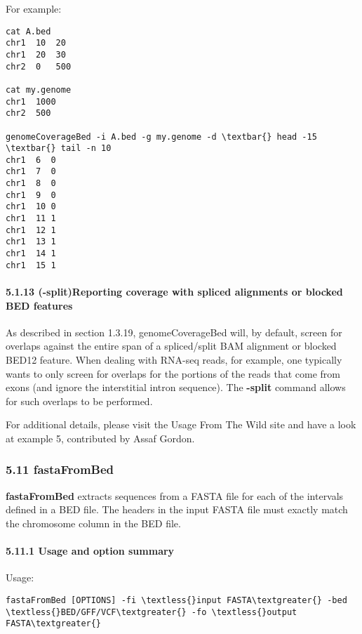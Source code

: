 \documentclass[letterpaper,10pt,english]{sphinxmanual}
\begin{document}
For example:

\begin{Verbatim}[commandchars=\\\{\}]
cat A.bed
chr1  10  20
chr1  20  30
chr2  0   500

cat my.genome
chr1  1000
chr2  500

genomeCoverageBed -i A.bed -g my.genome -d \textbar{} head -15 \textbar{} tail -n 10
chr1  6  0
chr1  7  0
chr1  8  0
chr1  9  0
chr1  10 0
chr1  11 1
chr1  12 1
chr1  13 1
chr1  14 1
chr1  15 1
\end{Verbatim}


\paragraph{5.1.13 (-split)Reporting coverage with spliced alignments or blocked BED features}
\label{content/genomecoverageBed:split-reporting-coverage-with-spliced-alignments-or-blocked-bed-features}
As described in section 1.3.19, genomeCoverageBed will, by default, screen for overlaps against the
entire span of a spliced/split BAM alignment or blocked BED12 feature. When dealing with RNA-seq
reads, for example, one typically wants to only screen for overlaps for the portions of the reads that
come from exons (and ignore the interstitial intron sequence). The \textbf{-split} command allows for such
overlaps to be performed.

For additional details, please visit the Usage From The Wild site and have a look at example 5,
contributed by Assaf Gordon.


\subsubsection{5.11 fastaFromBed}
\label{content/fastafromBed:fastafrombed}\label{content/fastafromBed::doc}
\textbf{fastaFromBed} extracts sequences from a FASTA file for each of the intervals defined in a BED file.
The headers in the input FASTA file must exactly match the chromosome column in the BED file.


\paragraph{5.11.1 Usage and option summary}
\label{content/fastafromBed:usage-and-option-summary}
Usage:

\begin{Verbatim}[commandchars=\\\{\}]
fastaFromBed [OPTIONS] -fi \textless{}input FASTA\textgreater{} -bed \textless{}BED/GFF/VCF\textgreater{} -fo \textless{}output FASTA\textgreater{}
\end{Verbatim}
\end{document}
